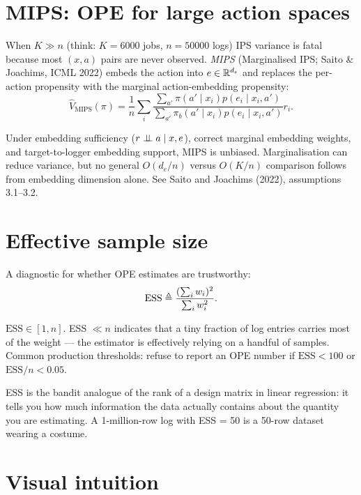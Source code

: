 \documentclass[11pt,oneside]{scrbook}
\begin{document}
\section{MIPS: OPE for large action spaces}

When $K \gg n$ (think: $K = 6000$ jobs, $n = 50000$ logs) IPS variance is
fatal because most $(x, a)$ pairs are never observed. \emph{MIPS}
(Marginalised IPS; Saito \& Joachims, ICML 2022) embeds the action into
$e \in \mathbb{R}^{d_e}$ and replaces the per-action propensity with the
marginal action-embedding propensity:
\[
\hat V_{\mathrm{MIPS}}(\pi) = \frac{1}{n} \sum_i \frac{\sum_{a'} \pi(a' \mid x_i) p(e_i \mid x_i, a')}{\sum_{a'}\pi_b(a'\mid x_i)p(e_i\mid x_i,a')} r_i.
\]

\begin{theorem}
Under embedding sufficiency ($r \perp\!\!\!\perp a \mid x,e$), correct marginal embedding weights, and target-to-logger embedding support, MIPS is unbiased. Marginalisation can reduce variance, but no general $O(d_e/n)$ versus $O(K/n)$ comparison follows from embedding dimension alone. See Saito and Joachims (2022), assumptions 3.1--3.2.
\end{theorem}

\section{Effective sample size}

A diagnostic for whether OPE estimates are trustworthy:
\[
\mathrm{ESS} \triangleq \frac{(\sum_i w_i)^2}{\sum_i w_i^2}.
\]

$\mathrm{ESS} \in [1, n]$. ESS $\ll n$ indicates that a tiny fraction of
log entries carries most of the weight --- the estimator is effectively
relying on a handful of samples. Common production thresholds: refuse to
report an OPE number if $\mathrm{ESS} < 100$ or $\mathrm{ESS}/n < 0.05$.

\begin{intuition}
ESS is the bandit analogue of the rank of a design matrix in linear
regression: it tells you how much information the data actually contains
about the quantity you are estimating. A 1-million-row log with ESS = 50
is a 50-row dataset wearing a costume.
\end{intuition}

\section{Visual intuition}
\end{document}
